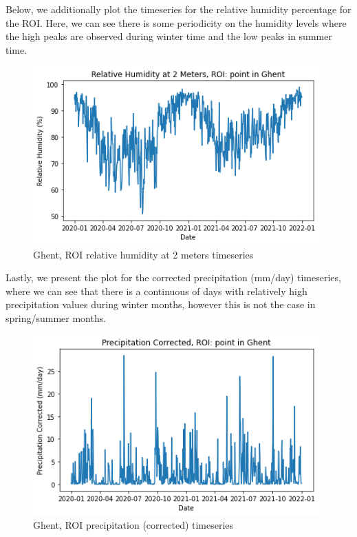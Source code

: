 Below, we additionally plot the timeseries for the relative humidity percentage for the ROI. Here, we can see there is some periodicity on the humidity levels where the high peaks are observed during winter time and the low peaks in summer time.

\begin{figure}[h]
    \centering
    \includegraphics[width=11cm]{figures/q3_4_relative_humidity.png}
    \caption{Ghent, ROI relative humidity at 2 meters timeseries}
    \label{fig:Ghent, ROI relative humidity at 2 meters timeseries}
\end{figure}
\FloatBarrier %

Lastly, we present the plot for the corrected precipitation (mm/day) timeseries, where we can see that there is a continuous of days with relatively high precipitation values during winter months, however this is not the case in spring/summer months.

\begin{figure}[h]
    \centering
    \includegraphics[width=11cm]{figures/q3_4_relative_precipitation.png}
    \caption{Ghent, ROI precipitation (corrected) timeseries}
    \label{fig:Ghent, ROI precipitation (corrected) timeseries}
\end{figure}
\FloatBarrier %

